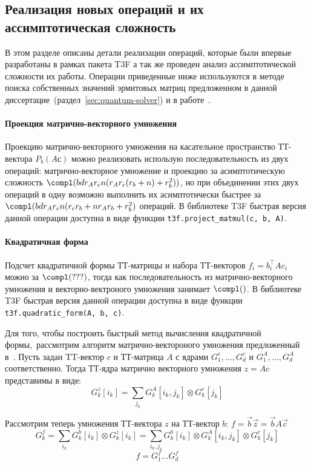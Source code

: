 \subsection{Реализация новых операций и их ассимптотическая сложность}
В этом разделе описаны детали реализации операций, которые были впервые разработаны в рамках пакета T3F а так же проведен анализ ассимптотической сложности их работы. Операции приведенные ниже используются в методе поиска собственных значений эрмитовых матриц предложенном в данной диссертацие~(раздел~\ref{sec:quantum-solver}) и в работе~\cite{izmailov2018scalable}.


\paragraph{Проекция матрично-векторного умножения}
Проекцию матрично-векторного умножения на касательное пространство ТТ-вектора $P_b(Aс)$ можно реализовать использую последовательность из двух операций: матрично-векторное умножение и проекцию за асимптотическую сложность $\compl(b d r_A r_c n (r_A r_c (r_b + n) + r_b^2))$, но при объединении этих двух операций в одну возможно выполнить их асимптотически быстрее за $\compl(b d r_A r_c n (r_c r_b + n r_A r_b + r_b^2)$ операций. В библиотеке T3F быстрая версия данной операции доступна в виде функции \texttt{t3f.project\_matmul(c, b, A)}.



\paragraph{Квадратичная форма}
Подсчет квадратичной формы ТТ-матрицы и набора ТТ-векторов $f_{i} = b_i^\intercal A c_i$ можно за $\compl(???)$, тогда как  последовательность из матрично-векторного умножения и векторно-вектроного умножения занимает $\compl()$. В библиотеке T3F быстрая версия данной операции доступна в виде функции \texttt{t3f.quadratic\_form(A, b, c)}.

Для того, чтобы построить быстрый метод вычисления квадратичной формы, рассмотрим алгоритм матрично-вектороного умножения предложенный в~\cite{oseledets2011ttMain}. Пусть задан TT-вектор $c$ и ТТ-матрица $A$ с ядрами $G_1^c, \ldots, G_d^c$ и $G_1^A, \ldots, G_d^A$ соответственно. Тогда ТТ-ядра матрично векторного умножения $z = Ac$ представимы в виде:
\[
G_k^z[i_k] = \sum_{j_k} G_k^A[i_k, j_k] \otimes G_k^c[j_k]
\]

Рассмотрим теперь умножения ТТ-вектора $z$ на ТТ-вектор $b$: $f = \vec{b}\vec{z} = \vec{b}A \vec{c}$
\[
G_k^f = \sum_{i_k} G_k^b[i_k] \otimes G_k^z[i_k] = \sum_{i_k, j_k} G_k^b[i_k] \otimes G_k^A[i_k, j_k] \otimes G_k^c[j_k]
\]
\[
f = G_1^f \ldots G_d^f
\]

